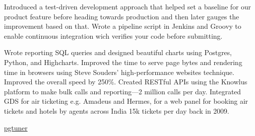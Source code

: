 \documentclass[10pt]{article} %
\begin{document}
\begin{paracol}{2}
{Introduced a test-driven development approach that helped set a baseline for our product feature before heading towards production and then later gauges the improvement based on that.}
{Wrote a pipeline script in Jenkins and Groovy to enable continuous integration wich verifies your code before submitting.}

{Wrote reporting SQL queries and designed beautiful charts using Postgres, Python, and Highcharts.}
{Improved the time to serve page bytes and rendering time in browsers using Steve Souders' high-performance websites technique. Improved the overall speed by 250\%.}
{Created RESTful APIs using the Knowlus platform to make bulk calls and reporting—2 million calls per day.}
{Integrated GDS for air ticketing e.g. Amadeus and Hermes, for a web panel for booking air tickets and hotels by agents across India 15k tickets per day back in 2009.}

 {\faGithub}\href{https://github.com/piyusgupta/pgtuner}{pgtuner}
\medskip %


\end{paracol}

\end{document}
